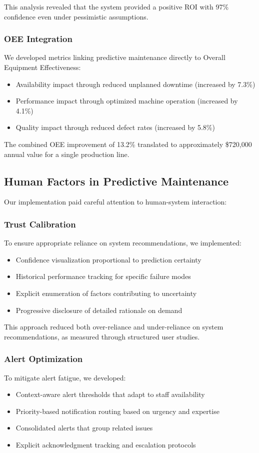 This analysis revealed that the system provided a positive ROI with 97\% confidence even under pessimistic assumptions.

\subsubsection{OEE Integration}
We developed metrics linking predictive maintenance directly to Overall Equipment Effectiveness:
\begin{itemize}
    \item Availability impact through reduced unplanned downtime (increased by 7.3\%)
    \item Performance impact through optimized machine operation (increased by 4.1\%)
    \item Quality impact through reduced defect rates (increased by 5.8\%)
\end{itemize}

The combined OEE improvement of 13.2\% translated to approximately \$720,000 annual value for a single production line.

\subsection{Human Factors in Predictive Maintenance}
Our implementation paid careful attention to human-system interaction:

\subsubsection{Trust Calibration}
To ensure appropriate reliance on system recommendations, we implemented:
\begin{itemize}
    \item Confidence visualization proportional to prediction certainty
    \item Historical performance tracking for specific failure modes
    \item Explicit enumeration of factors contributing to uncertainty
    \item Progressive disclosure of detailed rationale on demand
\end{itemize}

This approach reduced both over-reliance and under-reliance on system recommendations, as measured through structured user studies.

\subsubsection{Alert Optimization}
To mitigate alert fatigue, we developed:
\begin{itemize}
    \item Context-aware alert thresholds that adapt to staff availability
    \item Priority-based notification routing based on urgency and expertise
    \item Consolidated alerts that group related issues
    \item Explicit acknowledgment tracking and escalation protocols
\end{itemize}

